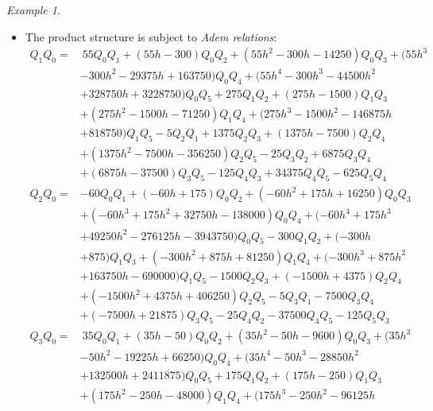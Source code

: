 \documentclass{gtpart}
\theoremstyle{definition}
\theoremstyle{remark}
\newtheorem{ex}[thm]{Example}
\renewcommand{\=}{\approx}
\renewcommand{\-}{\sim}
\numberwithin{equation}{section}
\numberwithin{thm}{section}
\begin{document}
\begin{ex}
\begin{itemize}
  \item {}\label{Adem} The product structure is subject to {\em Adem relations}: 
  \begin{equation*}
   \begin{split}
    Q_1 Q_0 = & ~ 55 Q_0 Q_1+(55 h-300) Q_0 Q_2+(55 h^2-300 h-14250) Q_0 Q_3 +(55 h^3 \\
              & -300 h^2-29375 h +163750) Q_0 Q_4+(55 h^4-300 h^3 -44500 h^2 \\
              & +328750 h+3228750) Q_0 Q_5 +275 Q_1 Q_2 +(275 h -1500) Q_1 Q_3 \\
              & +(275 h^2-1500 h-71250) Q_1 Q_4+(275 h^3 -1500 h^2 -146875 h \\
              & +818750) Q_1 Q_5-5 Q_2 Q_1+1375 Q_2 Q_3 +(1375 h-7500) Q_2 Q_4 \\
              & +(1375 h^2 -7500 h -356250) Q_2 Q_5 -25 Q_3 Q_2+6875 Q_3 Q_4 \\
              & +(6875 h-37500) Q_3 Q_5-125 Q_4 Q_3 +34375 Q_4 Q_5-625 Q_5 Q_4 
   \end{split}
  \end{equation*}
  \begin{equation*}
   \begin{split}
    Q_2 Q_0 = & -60 Q_0 Q_1+(-60 h+175) Q_0 Q_2+(-60 h^2+175 h+16250) Q_0 Q_3 \\
              & +(-60 h^3+175 h^2 +32750 h-138000) Q_0 Q_4+(-60 h^4+175 h^3 \\
              & +49250 h^2-276125 h-3943750) Q_0 Q_5 -300 Q_1 Q_2+(-300 h \\
              & +875) Q_1 Q_3+(-300 h^2+875 h+81250) Q_1 Q_4+(-300 h^3 +875 h^2 \\
              & +163750 h-690000) Q_1 Q_5-1500 Q_2 Q_3+(-1500 h +4375) Q_2 Q_4 \\
              & +(-1500 h^2 +4375 h +406250) Q_2 Q_5-5 Q_3 Q_1 -7500 Q_3 Q_4 \\
              & +(-7500 h+21875) Q_3 Q_5-25 Q_4 Q_2 -37500 Q_4 Q_5 -125 Q_5 Q_3 \\
    Q_3 Q_0 = & ~ 35 Q_0 Q_1+(35 h-50) Q_0 Q_2+(35 h^2-50 h-9600) Q_0 Q_3+(35 h^3 \\
              & -50 h^2-19225 h +66250) Q_0 Q_4+(35 h^4-50 h^3-28850 h^2 \\
              & +132500 h+2411875) Q_0 Q_5+175 Q_1 Q_2 +(175 h-250) Q_1 Q_3 \\
              & +(175 h^2-250 h-48000) Q_1 Q_4+(175 h^3-250 h^2-96125 h \\

\end{split}
\end{equation*}
\end{itemize}
\end{ex}
\end{document}

